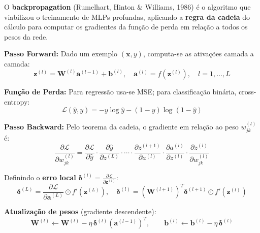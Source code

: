\documentclass[12pt,a4paper]{article}
\begin{document}
O \textbf{backpropagation} (Rumelhart, Hinton \& Williams, 1986) é o algoritmo que viabilizou o treinamento de MLPs profundas, aplicando a \textbf{regra da cadeia} do cálculo para computar os gradientes da função de perda em relação a todos os pesos da rede.

\textbf{Passo Forward:} Dado um exemplo $(\mathbf{x}, y)$, computa-se as ativações camada a camada:
\[
  \mathbf{z}^{(l)} = \mathbf{W}^{(l)} \mathbf{a}^{(l-1)} + \mathbf{b}^{(l)}, \quad
  \mathbf{a}^{(l)} = f\!\left(\mathbf{z}^{(l)}\right), \quad l = 1, \ldots, L
\]

\textbf{Função de Perda:} Para regressão usa-se MSE; para classificação binária, cross-entropy:
\[
  \mathcal{L}(\hat{y}, y) = -y\log\hat{y} - (1-y)\log(1-\hat{y})
\]

\textbf{Passo Backward:} Pelo teorema da cadeia, o gradiente em relação ao peso $w_{jk}^{(l)}$ é:
\[
  \frac{\partial \mathcal{L}}{\partial w_{jk}^{(l)}} =
  \frac{\partial \mathcal{L}}{\partial \hat{y}} \cdot
  \frac{\partial \hat{y}}{\partial z^{(L)}} \cdot \cdots \cdot
  \frac{\partial z^{(l+1)}}{\partial a^{(l)}} \cdot
  \frac{\partial a^{(l)}}{\partial z^{(l)}} \cdot
  \frac{\partial z^{(l)}}{\partial w_{jk}^{(l)}}
\]

Definindo o \textbf{erro local} $\boldsymbol{\delta}^{(l)} = \frac{\partial \mathcal{L}}{\partial \mathbf{z}^{(l)}}$:
\[
  \boldsymbol{\delta}^{(L)} = \frac{\partial \mathcal{L}}{\partial \mathbf{a}^{(L)}} \odot f'\!\left(\mathbf{z}^{(L)}\right),
  \quad
  \boldsymbol{\delta}^{(l)} = \left(\mathbf{W}^{(l+1)}\right)^T \boldsymbol{\delta}^{(l+1)} \odot f'\!\left(\mathbf{z}^{(l)}\right)
\]

\textbf{Atualização de pesos} (gradiente descendente):
\[
  \mathbf{W}^{(l)} \leftarrow \mathbf{W}^{(l)} - \eta \, \boldsymbol{\delta}^{(l)} \left(\mathbf{a}^{(l-1)}\right)^T,
  \qquad
  \mathbf{b}^{(l)} \leftarrow \mathbf{b}^{(l)} - \eta \, \boldsymbol{\delta}^{(l)}
\]
\end{document}
